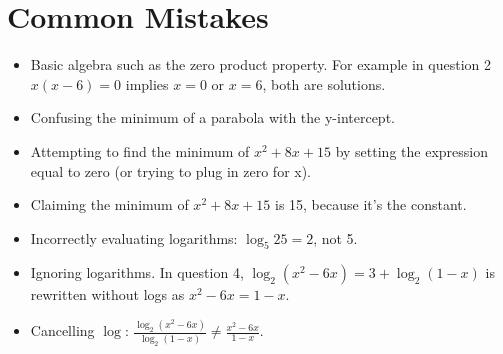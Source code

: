 \documentclass[a4paper, 12pt]{article}
\begin{document}
\newpage

\section*{Common Mistakes}

\begin{itemize}
    \item Basic algebra such as the zero product property. For example in question 2$x(x-6) = 0$ implies $x=0$ or $x=6$, both are solutions.
    \item Confusing the minimum of a parabola with the y-intercept. 
    \item Attempting to find the minimum of $x^2 + 8x + 15$ by setting the expression equal to zero (or trying to plug in zero for x).
    \item Claiming the minimum of $x^2 + 8x +15 $ is 15, because it's the constant.
    \item Incorrectly evaluating logarithms: $\log_5 25 = 2$, not 5.
    \item Ignoring logarithms. In question 4,  $\log_2 (x^2 -6x) = 3 + \log_2(1-x)$ is rewritten without logs as $x^2 - 6x = 1-x$.
    \item Cancelling $\log$: 
    $\frac{\log_2 (x^2 - 6x) }{\log_2 ( 1-x) } \neq \frac{x^2 - 6x }{1-x}$.
\end{itemize}
\end{document}
